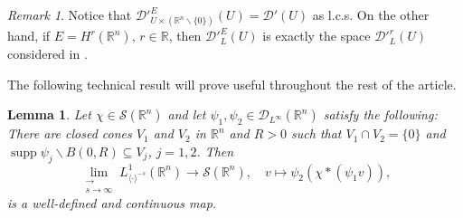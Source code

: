 \documentclass[12pt,reqno]{amsart}
\newcommand{\RR}{\mathbb R}
\newcommand{\DD}{\mathcal D}
\newcommand{\SSS}{\mathcal S}
\newcommand{\supp}{\operatorname{supp}}
\theoremstyle{plain}
\newtheorem{lemma}[theorem]{Lemma}
\theoremstyle{remark}
\newtheorem{remark}[theorem]{Remark}
\theoremstyle{definition}
\numberwithin{equation}{section}
\begin{document}
\begin{remark}
Notice that $\DD'^E_{U\times(\RR^n\backslash\{0\})}(U)=\DD'(U)$ as l.c.s. On the other hand, if $E=H^r(\RR^n)$, $r\in\RR$, then $\DD'^E_L(U)$ is exactly the space $\DD'^r_L(U)$ considered in \cite{PP}.
\end{remark}

The following technical result will prove useful throughout the rest of the article.

\begin{lemma}\label{lem-for-est-oftheremininestwavefrps}
Let $\chi\in\SSS(\RR^n)$ and let $\psi_1,\psi_2\in\DD_{L^{\infty}}(\RR^n)$ satisfy the following: There are closed cones $V_1$ and $V_2$ in $\RR^n$ and $R>0$ such that $V_1\cap V_2=\{0\}$ and $\supp\psi_j\backslash B(0,R)\subseteq V_j$, $j=1,2$. Then
\begin{equation}\label{map-con-onskl}
\lim_{\substack{\longrightarrow \\ s\rightarrow\infty}}L^1_{\langle \cdot\rangle^{-s}}(\RR^n)\rightarrow \SSS(\RR^n),\quad v\mapsto \psi_2(\chi*(\psi_1v)),
\end{equation}
is a well-defined and continuous map.
\end{lemma}
\end{document}
